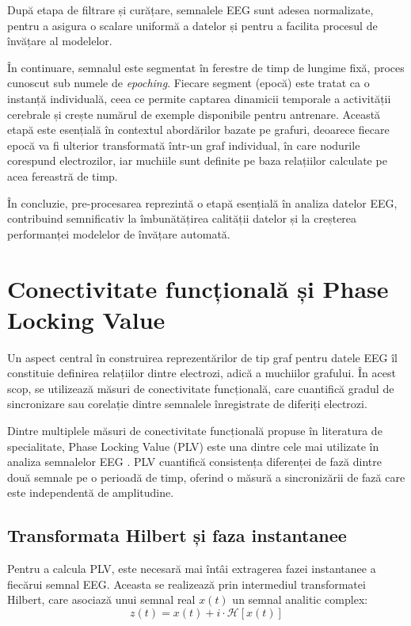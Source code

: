\documentclass[12pt,a4paper]{report}
\theoremstyle{definition}
\theoremstyle{remark}
\begin{document}
După etapa de filtrare și curățare, semnalele EEG sunt adesea normalizate, pentru a asigura o scalare uniformă a datelor și pentru a facilita procesul de învățare al modelelor.

În continuare, semnalul este segmentat în ferestre de timp de lungime fixă, proces cunoscut sub numele de \textit{epoching}. Fiecare segment (epocă) este tratat ca o instanță individuală, ceea ce permite captarea dinamicii temporale a activității cerebrale și crește numărul de exemple disponibile pentru antrenare. Această etapă este esențială în contextul abordărilor bazate pe grafuri, deoarece fiecare epocă va fi ulterior transformată într-un graf individual, în care nodurile corespund electrozilor, iar muchiile sunt definite pe baza relațiilor calculate pe acea fereastră de timp.

În concluzie, pre-procesarea reprezintă o etapă esențială în analiza datelor EEG, contribuind semnificativ la îmbunătățirea calității datelor și la creșterea performanței modelelor de învățare automată.

\section{Conectivitate funcțională și Phase Locking Value}
\label{sec:plv}

Un aspect central în construirea reprezentărilor de tip graf pentru datele EEG îl constituie definirea relațiilor dintre electrozi, adică a muchiilor grafului. În acest scop, se utilizează măsuri de conectivitate funcțională, care cuantifică gradul de sincronizare sau corelație dintre semnalele înregistrate de diferiți electrozi.

Dintre multiplele măsuri de conectivitate funcțională propuse în literatura de specialitate, Phase Locking Value (PLV) este una dintre cele mai utilizate în analiza semnalelor EEG \cite{klepl2023gnn}. PLV cuantifică consistența diferenței de fază dintre două semnale pe o perioadă de timp, oferind o măsură a sincronizării de fază care este independentă de amplitudine.

\subsection{Transformata Hilbert și faza instantanee}

Pentru a calcula PLV, este necesară mai întâi extragerea fazei instantanee a fiecărui semnal EEG. Aceasta se realizează prin intermediul transformatei Hilbert, care asociază unui semnal real $x(t)$ un semnal analitic complex:
\begin{equation}
    z(t) = x(t) + i \cdot \mathcal{H}[x(t)]
    \label{eq:analytic}
\end{equation}
\end{document}
